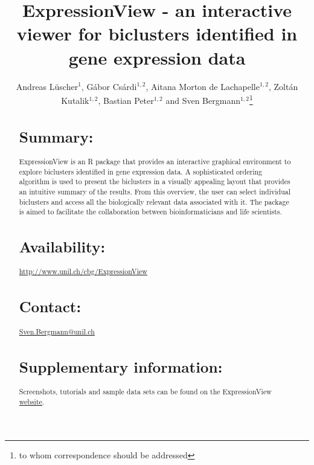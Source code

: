 \documentclass[round]{bioinfo}
\begin{document}
\application{}
\title[ExpressionView]{ExpressionView - an interactive viewer for
  biclusters identified in gene expression data} 
\author[Andreas L\"uscher, G\'abor Cs\'ardi, Aitana Morton de
Lachapelle, Zolt\'an Kutalik, and Sven Bergmann]{Andreas
  L\"uscher$^1$, G\'abor Cs\'ardi$^{1,2}$, Aitana Morton de
  Lachapelle$^{1,2}$, Zolt\'an Kutalik$^{1,2}$, Bastian Peter$^{1,2}$
  and Sven Bergmann$^{1,2}$\footnote{to whom correspondence should be
    addressed}} 
\address{
  $^{1}$Swiss Institute of Bioinformatics, Lausanne, Switzerland\\
  $^{2}$Department of Medical Genetics, University of Lausanne,
  Lausanne, Switzerland 
}



\maketitle

\begin{abstract}

\section{Summary:}
ExpressionView is an R package that provides an interactive graphical
environment to explore biclusters identified in gene expression
data. A sophisticated ordering algorithm is used to present the
biclusters in a visually appealing layout that provides an intuitive
summary of the results. From this overview, the user can select
individual biclusters and access all the biologically relevant data
associated with it. The package is aimed to facilitate the
collaboration between bioinformaticians and life scientists.

\section{Availability:} 
\url{http://www.unil.ch/cbg/ExpressionView}

\section{Contact:} \href{Sven.Bergmann@unil.ch}{Sven.Bergmann@unil.ch}

\section{Supplementary information:}
Screenshots, tutorials and sample data sets can be found on the
ExpressionView \href{http://www.unil.ch/cbg/ExpressionView}{website}. 

\end{abstract}
\end{document}
